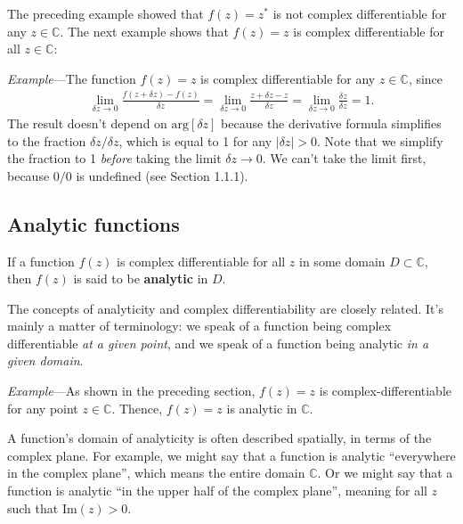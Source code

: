 \documentclass[10pt,a4paper]{article}
\begin{document}
The preceding example showed that $f(z) = z^*$ is not complex
differentiable for any $z \in \mathbb{C}$.  The next example shows
that $f(z) = z$ is complex differentiable for all $z \in \mathbb{C}$:

\begin{framed}\noindent
  \textit{Example}---The function $f(z) = z$ is complex differentiable for any $z \in \mathbb{C}$, since
  \begin{align}
    \lim_{\delta z \rightarrow0} \frac{f(z+\delta z) - f(z)}{\delta z} = \lim_{\delta z \rightarrow0} \frac{z+\delta z - z}{\delta z} = \lim_{\delta z \rightarrow0} \frac{\delta z}{\delta z} = 1.
  \end{align}
  The result doesn't depend on $\mathrm{arg}[\delta z]$ because the
  derivative formula simplifies to the fraction $\delta z / \delta z$,
  which is equal to 1 for any $|\delta z| > 0$. Note that we simplify
  the fraction to 1 \textit{before} taking the limit $\delta z
  \rightarrow 0$. We can't take the limit first, because $0/0$ is
  undefined (see Section 1.1.1).
\end{framed}

\subsection{Analytic functions}
\label{analytic-functions}

If a function $f(z)$ is complex differentiable for all $z$ in some
domain $D\subset \mathbb{C}$, then $f(z)$ is said to be
\textbf{analytic} in $D$.

The concepts of analyticity and complex differentiability are closely
related. It's mainly a matter of terminology: we speak of a function
being complex differentiable \textit{at a given point}, and we speak
of a function being analytic \textit{in a given domain}.

\begin{framed}\noindent
  \textit{Example}---As shown in the preceding section, $f(z) = z$ is
  complex-differentiable for any point $z \in \mathbb{C}$.  Thence,
  $f(z) = z$ is analytic in $\mathbb{C}$.
\end{framed}

A function's domain of analyticity is often described spatially, in
terms of the complex plane.  For example, we might say that a function
is analytic ``everywhere in the complex plane'', which means the
entire domain $\mathbb{C}$.  Or we might say that a function is
analytic ``in the upper half of the complex plane'', meaning for all
$z$ such that $\mathrm{Im}(z) > 0$.
\end{document}
